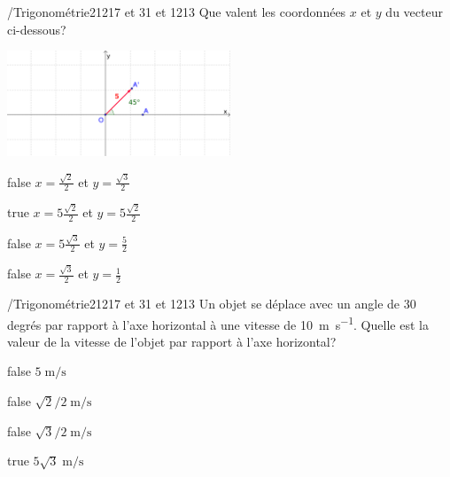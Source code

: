 \documentclass[11pt]{article}
\begin{document}
            \begin{question}{/}{Trigonométrie}{2}{1217 et 31 et 1213}
                Que valent les coordonnées $x$ et $y$ du vecteur ci-dessous?
                \begin{center}
                	\includegraphics[width=0.5\textwidth]{Philippe/Figures_Philippe/trigo_1_5.png}
                \end{center}
            \end{question}

            \begin{reponses}
                \item[false] $x = \frac{\sqrt{2}}{2}$ et $y = \frac{\sqrt{3}}{2}$
                \item[true] $x = 5\frac{\sqrt{2}}{2}$ et $y = 5\frac{\sqrt{2}}{2}$
                \item[false] $x = 5\frac{\sqrt{3}}{2}$ et $y = \frac{5}{2}$
                \item[false] $x = \frac{\sqrt{3}}{2}$ et $y = \frac{1}{2}$
            \end{reponses}

            \begin{question}{/}{Trigonométrie}{2}{1217 et 31 et 1213}
            	Un objet se déplace avec un angle de 30 degrés par rapport à l'axe horizontal à une vitesse de \SI{10}{\meter\per\second}. Quelle est la valeur de la vitesse de l'objet par rapport à l'axe horizontal?
            \end{question}

            \begin{reponses}
                \item[false] $5\;\si{\meter\per\second}$
                \item[false] $\sqrt{2}/2\;\si{\meter\per\second}$
                \item[false] $\sqrt{3}/2\;\si{\meter\per\second}$
                \item[true] $5\sqrt{3}\;\si{\meter\per\second}$
            \end{reponses}
        
\end{document}
